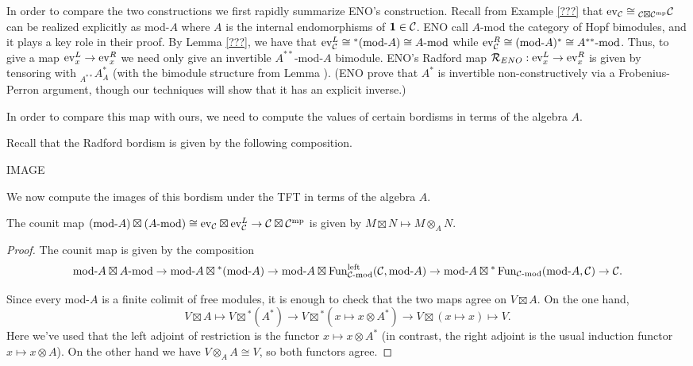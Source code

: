 \documentclass{amsart}
\begin{document}
In order to compare the two constructions we first rapidly summarize ENO's construction.  Recall from Example \ref{???} that $\mathrm{ev}_\mathcal C \cong {}_{\mathcal C \boxtimes \mathcal C^{\mathrm{mp}}}\mathcal C$ can be realized explicitly as mod-$A$ where $A$ is the internal endomorphisms of $\mathbf{1} \in \mathcal C$. 
ENO call $A$-mod the category of Hopf bimodules, and it plays a key role in their proof.  By Lemma \ref{???}, we have that $\mathrm{ev}_\mathcal C^L \cong {}^*(\text{mod-}A) \cong A\text{-mod}$ while $\mathrm{ev}_\mathcal C^R \cong (\text{mod-}A)^* \cong A^{**}\text{-mod}$.  Thus, to give a map $\mathrm{ev}_x^L \rightarrow \mathrm{ev}_x^R$ we need only give an invertible $A^{**}$-mod-$A$ bimodule.  ENO's Radford map $\mathcal R_{ENO}: \mathrm{ev}_x^L \rightarrow \mathrm{ev}_x^R$ is given by tensoring with ${}_{A^{**}}A^*_A$ (with the bimodule structure from Lemma \cite{???}).  (ENO prove that $A^*$ is invertible non-constructively via a Frobenius-Perron argument, though our techniques will show that it has an explicit inverse.)


In order to compare this map with ours, we need to compute the values of certain bordisms in terms of the algebra $A$.

Recall that the Radford bordism is given by the following composition.

IMAGE

We now compute the images of this bordism under the TFT in terms of the algebra $A$.

\begin{lemma}
The counit map $(\text{mod-}A) \boxtimes (A\text{-mod}) \cong \mathrm{ev}_\mathcal C \boxtimes \mathrm{ev}_\mathcal C^L \rightarrow \mathcal C \boxtimes \mathcal C^{\mathrm{mp}}$ is given by $M \boxtimes N \mapsto M \otimes_A N$.
\end{lemma}
\begin{proof}
The counit map is given by the composition 
$$\text{mod-}A \boxtimes A\text{-mod} \rightarrow \text{mod-}A \boxtimes {}^*(\text{mod-}A) \rightarrow \text{mod-}A \boxtimes \operatorname{Fun}_{\mathcal C\text{-mod}}^{\text{left}}(\mathcal C, \text{mod-}A) \rightarrow \text{mod-}A \boxtimes {}^*\operatorname{Fun}_{\mathcal C\text{-mod}}(\text{mod-}A, \mathcal C) \rightarrow \mathcal C.$$

Since every mod-$A$ is a finite colimit of free modules, it is enough to check that the two maps agree on $V \boxtimes A$.  On the one hand,
$$V \boxtimes A \mapsto V \boxtimes {}^*(A^*) \rightarrow V \boxtimes {}^*(x \mapsto x \otimes A^*) \rightarrow V \boxtimes (x \mapsto x) \mapsto V.$$  Here we've used that the left adjoint of restriction is the functor $x \mapsto x \otimes A^*$ (in contrast, the right adjoint is the usual induction functor $x \mapsto x \otimes A$).  On the other hand we have $V \otimes_A A \cong V$, so both functors agree.
\end{proof}
\end{document}

